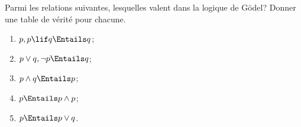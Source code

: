 \documentclass[../../../include/open-logic-section]{subfiles}
\begin{document}
\begin{prob}
  Parmi les relations suivantes,
  lesquelles valent dans la logique
  de G\"odel? Donner une table de
  vérité pour chacune.
  \begin{enumerate}
    \item $p,p\lif q\Entails q$;
    \item $p\lor q,\lnot p\Entails q$;
    \item $p\land q\Entails p$;
    \item $p\Entails p\land p$;
    \item $p\Entails p\lor q$.
  \end{enumerate}
\end{prob}
\end{document}
